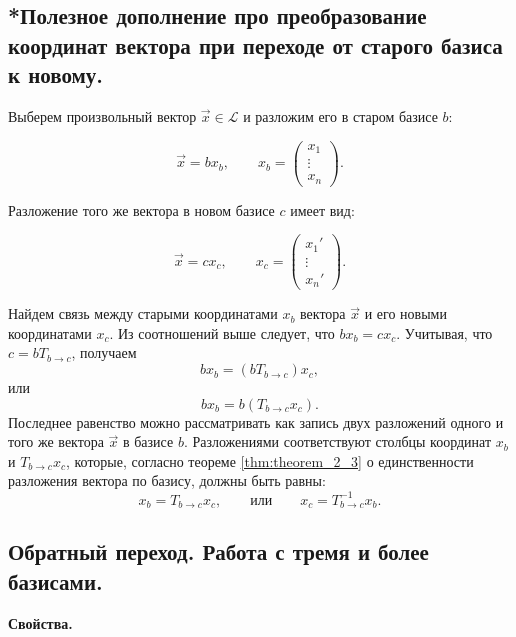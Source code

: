 \subsection{
    *Полезное дополнение про преобразование координат вектора при переходе от старого базиса к новому.
}

Выберем произвольный вектор $\vec{x} \in \mathcal{L}$ и разложим его в старом базисе $b$:

$$\vec{x} = bx_b, \quad \quad x_b = \begin{pmatrix} x_1 \\ \vdots \\ x_n \end{pmatrix}.$$

Разложение того же вектора в новом базисе $c$ имеет вид:

$$\vec{x} = cx_c, \quad \quad x_c = \begin{pmatrix} x_1' \\ \vdots \\ x_n' \end{pmatrix}.$$

Найдем связь между старыми координатами $x_b$ вектора $\vec{x}$ и его новыми координатами $x_c$. Из соотношений выше следует, что $bx_b = cx_c$. Учитывая, что $c = bT_{b \to c}$, получаем 
$$bx_b = (bT_{b \to c})x_c,$$ или 
$$bx_b = b(T_{b \to c}x_c).$$ 
Последнее равенство можно рассматривать как запись двух разложений одного и того же вектора $\vec{x}$ в базисе $b$. Разложениями соответствуют столбцы координат $x_b$ и $T_{b \to c}x_c$, которые, согласно теореме \ref{thm:theorem_2_3} о единственности разложения вектора по базису, должны быть равны:
$$x_b = T_{b \to c}x_c, \quad \quad \text{или} \quad \quad x_c = T^{-1}_{b \to c}x_b.$$


\newpage


\subsection{
    Обратный переход. Работа с тремя и более базисами.
}

\textbf{Свойства.}

